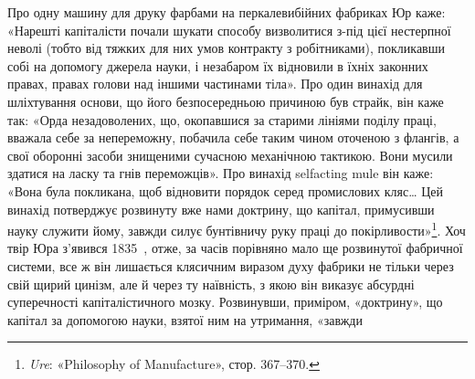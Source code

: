 Про одну машину для друку фарбами на перкалевибійних
фабриках Юр каже: «Нарешті капіталісти почали шукати способу
визволитися з-під цієї нестерпної неволі (тобто від тяжких
для них умов контракту з робітниками), покликавши собі на допомогу
джерела науки, і незабаром їх відновили в їхніх законних
правах, правах голови над іншими частинами тіла». Про один
винахід для шліхтування основи, що його безпосередньою причиною
був страйк, він каже так: «Орда незадоволених, що, окопавшися
за старими лініями поділу праці, вважала себе за непереможну,
побачила себе таким чином оточеною з флангів, а свої
оборонні засоби знищеними сучасною механічною тактикою. Вони
мусили здатися на ласку та гнів переможців». Про винахід
selfacting mule він каже: «Вона була покликана, щоб відновити
порядок серед промислових кляс\dots{} Цей винахід потверджує
розвинуту вже нами доктрину, що капітал, примусивши науку
служити йому, завжди силує бунтівничу руку праці до покірливости»\footnote{
\emph{Ure}: «Philosophy of Manufacture», стор. 367--370.
}. Хоч твір Юра з’явився 1835~, отже, за часів порівняно
мало ще розвинутої фабричної системи, все ж він лишається клясичним
виразом духу фабрики не тільки через свій щирий цинізм,
але й через ту наївність, з якою він виказує абсурдні суперечності
капіталістичного мозку. Розвинувши, приміром, «доктрину»,
що капітал за допомогою науки, взятої ним на утримання, «завжди
\parbreak{}  %
